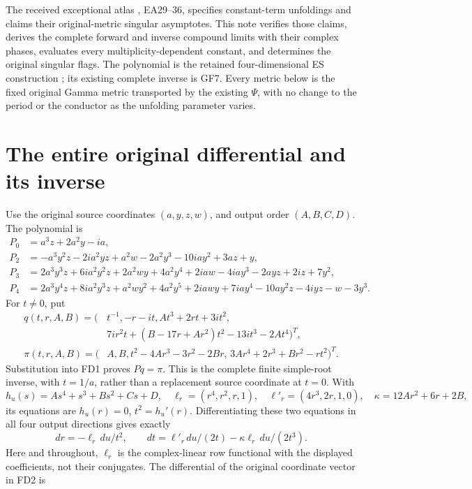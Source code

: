 The received exceptional atlas \cite{ExceptionalAtlas}, EA29--36, specifies
constant-term unfoldings and claims their original-metric singular
asymptotes. This note verifies those claims, derives the complete
forward and inverse compound limits with their complex phases,
evaluates every multiplicity-dependent constant, and determines
the original singular flags. The polynomial is the retained
four-dimensional ES construction \cite{ES488}; its existing complete
inverse is GF7. Every metric below is the fixed original Gamma
metric transported by the existing \(\Psi\), with no change to
the period or the conductor as the unfolding parameter varies.

\section{The entire original differential and its inverse}
Use the original source coordinates \((a,y,z,w)\), and output
order \((A,B,C,D)\). The polynomial is
\[
\begin{aligned}
P_0&=a^3z+2a^2y-ia,\\
P_2&=-a^3y^2z-2ia^2yz+a^2w-2a^2y^3-10iay^2+3az+y,\\
P_3&=2a^3y^3z+6ia^2y^2z+2a^2wy+4a^2y^4
       +2iaw-4iay^3-2ayz+2iz+7y^2,\\
P_4&=2a^3y^4z+8ia^2y^3z+a^2wy^2+4a^2y^5
       +2iawy+7iay^4-10ay^2z-4iyz-w-3y^3.
\end{aligned}\tag{FD1}
\]
For \(t\ne0\), put
\[
\begin{aligned}
q(t,r,A,B)=\bigl(&t^{-1},-r-it,At^3+2rt+3it^2,\\
 &7ir^2t+(B-17r+Ar^2)t^2-13it^3-2At^4\bigr)^T,\\
\pi(t,r,A,B)=\bigl(&A,B,t^2-4Ar^3-3r^2-2Br,\,
                      3Ar^4+2r^3+Br^2-rt^2\bigr)^T.
\end{aligned}\tag{FD2}
\]
Substitution into FD1 proves \(Pq=\pi\). This is the complete
finite simple-root inverse, with \(t=1/a\), rather than a
replacement source coordinate at \(t=0\). With
\[
 h_u(s)=As^4+s^3+Bs^2+Cs+D,\quad
 \ell_r=(r^4,r^2,r,1),\quad \ell'_r=(4r^3,2r,1,0),\quad
 \kappa=12Ar^2+6r+2B,
 \tag{FD3}
\]
its equations are \(h_u(r)=0\), \(t^2=h_u'(r)\).
Differentiating these two equations in all four output directions
gives exactly
\[
 dr=-\ell_r\,du/t^2,\qquad
 dt=\ell'_r\,du/(2t)-\kappa\ell_r\,du/(2t^3).
 \tag{FD4}
\]
Here and throughout, \(\ell_r\) is the complex-linear row
functional with the displayed coefficients, not their conjugates.
The differential of the original coordinate vector in FD2 is
